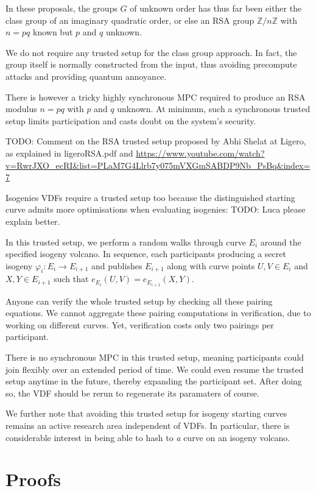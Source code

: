 \documentclass{article}
\newcommand{\Z}{\mathbb{Z}}
\begin{document}
In these proposals, the groups $G$ of unknown order has thus far been
either the class group of an imaginary quadratic order, or else an
RSA group $\Z/n\Z$ with $n = p q$ known but $p$ and $q$ unknown.

We do not require any trusted setup for the class group approach.
In fact, the group itself is normally constructed from the input,
thus avoiding precompute attacks and providing quantum annoyance.  

There is however a tricky highly synchronous MPC required to produce
an RSA modulus $n = p q$ with $p$ and $q$ unknown.  At minimum, such
a synchronous trusted setup limits participation and casts doubt on
the system's security.  

TODO: Comment on the RSA trusted setup proposed by Abhi Shelat at Ligero, as explained in ligeroRSA.pdf and  \url{https://www.youtube.com/watch?v=RwrJXO_ecRI&list=PLaM7G4Llrb7y075mVXGmSABDP9Nb_PsBq&index=7}

Isogenies VDFs require a trusted setup too because the distinguished
starting curve admits more optimisations when evaluating isogenies:
TODO: Luca please explain better.

In this trusted setup, we perform a random walks through curve $E_i$
around the specified isogeny volcano.  In sequence, each participants
producing a secret isogeny $φ_i : E_i \to E_{i+1}$ and publishes
$E_{i+1}$ along with curve points $U,V ∈ E_i$ and $X,Y ∈ E_{i+1}$
such that $e_{E_i}(U,V) = e_{E_{i+1}}(X,Y)$.  

Anyone can verify the whole trusted setup by checking all these
pairing equations.  We cannot aggregate these pairing computations
in verification, due to working on different curves.  Yet, verification
costs only two pairings per participant.

There is no synchronous MPC in this trusted setup, meaning participants
could join flexibly over an extended period of time.  We could even
resume the trusted setup anytime in the future, thereby expanding the
participant set.  After doing so, the VDF should be rerun to
regenerate its paramaters of course.

We further note that avoiding this trusted setup for isogeny starting
curves remains an active research area independent of VDFs. 
In particular, there is considerable interest in being able to hash to
{\it a} curve on an isogeny volcano.


\section{Proofs}
\end{document}
